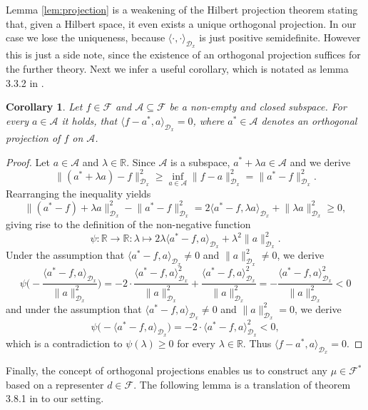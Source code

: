 \documentclass[11pt, a4paper]{article}
\newtheorem{corollary}[theorem]{Corollary}
\newcommand{\R}{\mathbb{R}}
\newcommand{\A}{\mathcal{A}}
\newcommand{\D}{\mathcal{D}}
\newcommand{\F}{\mathcal{F}}
\begin{document}
Lemma \ref{lem:projection} is a weakening of the Hilbert projection theorem stating that, given a Hilbert space, it even exists a unique orthogonal projection. In our case we lose the uniqueness, because $\langle \cdot, \cdot \rangle_{\D_x}$ is just positive semidefinite. However this is just a side note, since the existence of an orthogonal projection suffices for the further theory. Next we infer a useful corollary, which is notated as lemma 3.3.2 in \cite{FunctionalAnalysis}.

\begin{corollary} \label{cor:projection}
Let $f \in \F$ and $\A \subseteq \F$ be a non-empty and closed subspace. For every $a \in \A$ it holds, that $\langle f - a^* , a \rangle_{\D_x} = 0$, where $a^* \in \A$ denotes an orthogonal projection of $f$ on $\A$.
\end{corollary}

\begin{proof}
Let $a \in \A$ and $\lambda \in \R$. Since $\A$ is a subspace, $a^* + \lambda a \in \A$ and we derive
\[ \big \| (a^* + \lambda a) -f \big \|_{\D_x}^2 \geq  \inf_{a \in \A} \big \| f - a \big \|_{\D_x}^2 = \big \| a^* - f \big \|_{\D_x}^2. \]
Rearranging the inequality yields
\[ \big \| (a^* - f) + \lambda a \big \|_{\D_x} ^2 - \big \| a^* - f \big \|_{\D_x}^2 = 2 \big \langle a^* -f , \lambda a \big \rangle_{\D_x} + \big \| \lambda a \big \|_{\D_x}^2 \geq 0, \]
giving rise to the definition of the non-negative function
\[ \psi : \R \to \R : \lambda \mapsto 2 \lambda \big \langle a^* -f , a \big \rangle_{\D_x} + \lambda^2 \big \| a \big \|_{\D_x}^2. \]
Under the assumption that $\big \langle a^* - f , a \big \rangle_{\D_x} \neq 0$ and $\| a \|_{\D_x}^2 \neq 0$, we derive
\[ \psi \Big ( - \frac{ \big \langle a^* - f , a \big \rangle_{\D_x}}{\| a \|_{\D_x}^2} \Big ) = -2 \cdot \frac{ \big \langle a^* - f , a \big \rangle_{\D_x}^2}{ \| a \|_{\D_x}^2} + \frac{\big \langle a^* - f , a \big \rangle_{\D_x}^2}{ \| a \|_{\D_x}^2} = - \frac{ \big \langle a^* - f , a \big \rangle_{\D_x}^2}{ \| a \|_{\D_x}^2} < 0 \]
and under the assumption that $\big \langle a^* - f, a \big \rangle_{\D_x} \neq 0$ and $\| a \|_{\D_x}^2 = 0$, we derive
\[ \psi \Big ( -  \big \langle a^* - f , a \big \rangle_{\D_x} \Big ) = -2 \cdot \big \langle a^* - f , a \big \rangle_{\D_x}^2 < 0, \]
which is a contradiction to $\psi(\lambda) \geq 0$ for every $\lambda \in \R$. Thus $ \big \langle f - a^* , a \big \rangle_{\D_x} = 0$.
\end{proof}

Finally, the concept of orthogonal projections enables us to construct any $\mu \in \F^*$ based on a representer $d \in \F$. The following lemma is a translation of theorem 3.8.1 in \cite{FunctionalAnalysis} to our setting.
\end{document}
